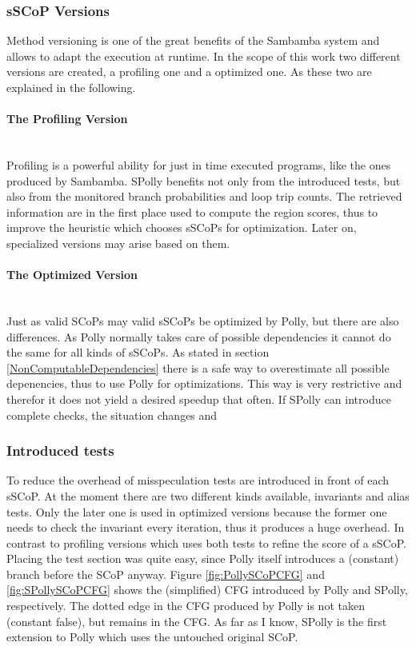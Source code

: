\subsubsection{sSCoP Versions}
Method versioning is one of the great benefits of the Sambamba system and allows
to adapt the execution at runtime. In the scope of this work two different 
versions are created, a profiling one and a optimized one. As these two are 
explained in the following.


\paragraph{The Profiling Version\\}
~\\
Profiling is a powerful ability for just in time executed programs, like the ones
produced by Sambamba. SPolly benefits not only from the introduced tests, but also
from the monitored branch probabilities and loop trip counts. The retrieved 
information are in the first place used to compute the region scores, thus to
improve the heuristic which chooses sSCoPs for optimization. Later on,
specialized versions may arise based on them. 



\paragraph{The Optimized Version \\}
~\\
Just as valid SCoPs may valid sSCoPs be optimized by Polly, but there are also 
differences. As Polly normally takes care of possible dependencies it cannot 
do the same for all kinds of sSCoPs. As stated in section \ref{NonComputableDependencies}
there is a safe way to overestimate all possible depenencies, thus to use Polly
for optimizations. This way is very restrictive and therefor it does not yield
a desired speedup that often. If SPolly can introduce complete checks, the 
situation changes and 




\subsubsection{Introduced tests}
To reduce the overhead of misspeculation tests are introduced in front of
each sSCoP. At the moment there are two different kinds available, 
invariants and alias tests. Only the later one is used in optimized 
versions because the former one needs to check the invariant
every iteration, thus it produces a huge overhead. In contrast to profiling 
versions which uses both tests to refine the score of a sSCoP.
Placing the test section was quite easy, since
Polly itself introduces a (constant) branch before the SCoP anyway. Figure
\ref{fig:PollySCoPCFG} and \ref{fig:SPollySCoPCFG} shows the (simplified) 
CFG introduced by Polly and SPolly, respectively. The dotted edge in the CFG
produced by Polly is not taken (constant false), but remains in the CFG. As far
as I know, SPolly is the first extension to Polly which uses the untouched 
original SCoP.


